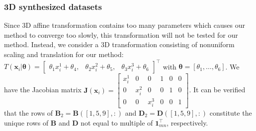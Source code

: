 \documentclass[11pt,bezier,]{article}
\begin{document}
    
    
\subsubsection{3D synthesized datasets \label{subsec:regu3Dtest}}   
Since 3D affine transformation contains too many parameters
which causes our method to converge too slowly,
this  transformation will not be tested for our method.
Instead, we consider a 3D transformation  consisting of nonuniform scaling  and translation for our method:
$T( \mathbf x_i| \boldsymbol\theta)= \begin{bmatrix}
  \theta_1 x_i^1  +\theta_4, &   \theta_2 x_i^2  +\theta_5, &
    \theta_3  x_i^3  +\theta_6
         \end{bmatrix}^\top
$ 
with $\boldsymbol\theta=[\theta_1,\ldots,\theta_6]$.
We have the Jacobian matrix 
$\mathbf J(\mathbf x_i)=\begin{bmatrix}
           x_i^1 & 0 & 0 & 1 & 0 & 0\\
  0 &  x_i^2 & 0 & 0 & 1 & 0\\
  0 & 0 &  x_i^3  & 0 & 0 & 1
        \end{bmatrix}
$.
It can be verified that the rows of 
$\mathbf B_2=\mathbf B([1,5,9],:)$  and $\mathbf D_2=\mathbf D([1,5,9],:)$ 
constitute the unique rows of $\mathbf B$ and  $\mathbf D$
not equal to multiple of $\mathbf 1_{mn}^\top$, respectively.
\end{document}
